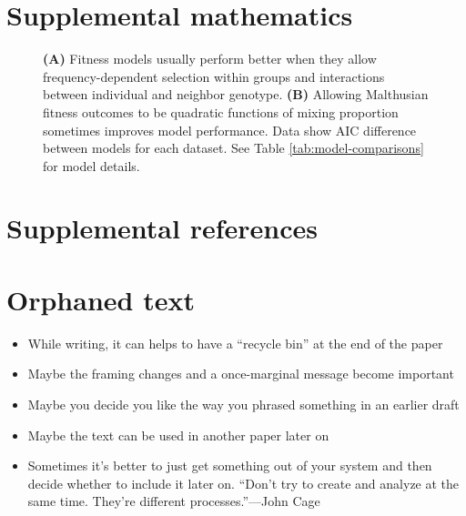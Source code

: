 \documentclass[11pt]{article}
\begin{document}
\clearpage
\pagestyle{fancy}
\fancyhf{}
\cfoot{\small \thepage}

% 
% 
\clearpage
\section*{Supplemental mathematics}
\label{sec:supplemental-math}


% 
% 

\begin{figure}[p]
\caption{\textbf{(A)} Fitness models usually perform better when they allow frequency-dependent selection within groups and interactions between individual and neighbor genotype. \textbf{(B)} Allowing Malthusian fitness outcomes to be quadratic functions of mixing proportion sometimes improves model performance. Data show AIC difference between models for each dataset. 
See Table \ref{tab:model-comparisons} for model details.}
\label{fig:nonadditivity-components}
\end{figure}

% 
% 
\section{Supplemental references}
\label{sec:supplemental-references}


% 
% 
\clearpage
\pagestyle{empty}
\section{Orphaned text}

\begin{itemize}
	\item While writing, it can helps to have a ``recycle bin'' at the end of the paper
	\item Maybe the framing changes and a once-marginal message become important
	\item Maybe you decide you like the way you phrased something in an earlier draft
	\item Maybe the text can be used in another paper later on
	\item Sometimes it's better to just get something out of your system and then decide whether to include it later on. ``Don't try to create and analyze at the same time. They're different processes.''---John Cage 
\end{itemize}
\end{document}
